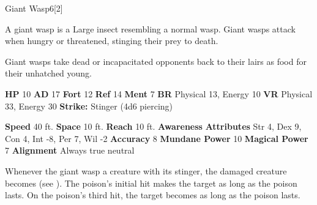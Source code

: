   \begin{monsection}{Giant Wasp}{6}[2]
    \vspace{-1em}\vspace{-1em}
    \vspace{0em}

    
        A giant wasp is a Large insect resembling a normal wasp.
        Giant wasps attack when hungry or threatened, stinging their prey to death.
      
        Giant wasps take dead or incapacitated opponents back to their lairs as food for their unhatched young.
      

    \begin{spellcontent}
      \begin{spelltargetinginfo}
        \pari \textbf{HP} 10 \monsep
          \textbf{AD} 17 \monsep
          \textbf{Fort} 12 \monsep
          \textbf{Ref} 14 \monsep
          \textbf{Ment} 7
        \pari \textbf{BR} Physical 13, Energy 10 \monsep
        \textbf{VR} Physical 33, Energy 30
        \pari \textbf{Strike:}
            Stinger  (4d6 piercing)
      \end{spelltargetinginfo}
    \end{spellcontent}
    \begin{monsterfooter}
      \pari \textbf{Speed} 40 ft. \monsep
        \textbf{Space} 10 ft. \monsep
        \textbf{Reach} 10 ft.
      \pari \textbf{Awareness} 
      \pari \textbf{Attributes}
        Str 4, Dex 9,
        Con 4, Int -8,
        Per 7, Wil -2
      \pari \textbf{Accuracy} 8 \monsep
        \textbf{Mundane Power} 10 \monsep
      \textbf{Magical Power} 7
      \pari \textbf{Alignment} Always true neutral
    \end{monsterfooter}
  \end{monsection}
          Whenever the giant wasp  a creature with its stinger,
            the damaged creature becomes  (see ).
          The poison's initial hit makes the target  as long as the poison lasts.
          On the poison's third hit, the target becomes  as long as the poison lasts.
  
